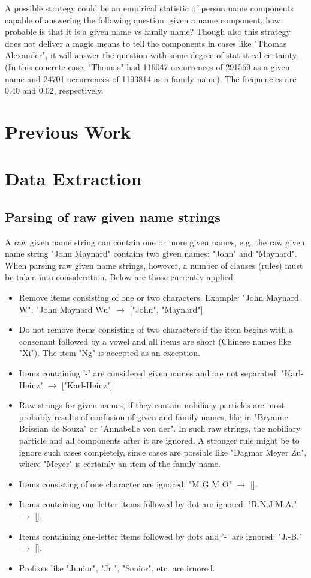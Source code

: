 \documentclass[12pt,a4paper]{article}
\newcommand{\gn}{given name\xspace}
\newcommand{\fn}{family name\xspace}
\begin{document}
	A possible strategy could be an empirical statistic of person name components capable of answering the following question: given a name component, how probable is that it is a \gn vs \fn? Though also this strategy does not deliver a magic means to tell the components in cases like "Thomas Alexander", it will answer the question with some degree of statistical certainty. (In this concrete case, "Thomas" had 116047 occurrences of 291569 as a given name and 24701 occurrences of 1193814 as a family name). The frequencies are 0.40 and 0.02, respectively. 
	
	\section{Previous Work}
	
	\section{Data Extraction}
		\subsection{Parsing of raw given name strings}
		A raw given name string can contain one or more given names, e.g. the raw given name string "John Maynard" contains two given names: "John" and "Maynard". When parsing raw given name strings, however, a number of clauses (rules) must be taken into consideration. Below are those currently applied.
		\begin{itemize}
			\item Remove items consisting of one or two characters. Example: "John Maynard W", "John Maynard Wu" $ \rightarrow $ ["John", "Maynard"]
			\item Do not remove items consisting of two characters if the item begins with a consonant followed by a vowel and all items are short (Chinese names like "Xi"). The item "Ng" is accepted as an exception.
			\item Items containing '-' are considered given names and are not separated: "Karl-Heinz" $ \rightarrow $ ["Karl-Heinz"]
			\item Raw strings for given names, if they contain nobiliary particles are most probably results of confusion of given and family names, like in "Bryanne Brissian de Souza" or "Annabelle von der". In such raw strings, the nobiliary particle and all components after it are ignored. A stronger rule might be to ignore such cases completely, since cases are possible like "Dagmar Meyer Zu", where "Meyer" is certainly an item of the family name.
			\item Items consisting of one character are ignored: "M G M O" $ \rightarrow $ [].
			\item Items containing one-letter items followed by dot are ignored: "R.N.J.M.A." $ \rightarrow $ [].
			\item Items containing one-letter items followed by dots and '-' are ignored: "J.-B." $ \rightarrow $ [].
			\item Prefixes like "Junior", "Jr.", "Senior", etc. are irnored.
		\end{itemize}
	
\end{document}
